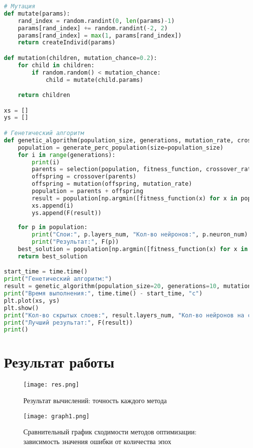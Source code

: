 \documentclass[a4paper, 14pt]{extarticle}
\begin{document}
\begin{lstlisting}[language=Python,caption={gen.py},label={lst:code3}]
# Мутация
def mutate(params):
    rand_index = random.randint(0, len(params)-1)
    params[rand_index] += random.randint(-2, 2)
    params[rand_index] = max(1, params[rand_index])
    return createIndivid(params)

def mutation(children, mutation_chance=0.2):
    for child in children:
        if random.random() < mutation_chance:
            child = mutate(child.params)

    return children

xs = []
ys = []

# Генетический алгоритм
def genetic_algorithm(population_size, generations, mutation_rate, crossover_rate):
    population = generate_perc_population(size=population_size)
    for i in range(generations):
        print(i)
        parents = selection(population, fitness_function, crossover_rate)
        offspring = crossover(parents)
        offspring = mutation(offspring, mutation_rate)
        population = parents + offspring
        result = population[np.argmin([fitness_function(x) for x in population])]
        xs.append(i)
        ys.append(F(result))
    
    for p in population:
        print("Слои:", p.layers_num, "Кол-во нейронов:", p.neuron_num)
        print("Результат:", F(p))
    best_solution = population[np.argmin([fitness_function(x) for x in population])]
    return best_solution

start_time = time.time()
print("Генетический алгоритм:")
result = genetic_algorithm(population_size=20, generations=10, mutation_rate=0.2, crossover_rate=0.5)
print("Время выполнения:", time.time() - start_time, "c")
plt.plot(xs, ys)
plt.show()
print("Кол-во скрытых слоев:", result.layers_num, "Кол-во нейронов на скрытых слоях:", result.neuron_num)
print("Лучший результат:", F(result))
print()
\end{lstlisting}

\section{Результат работы}\label{Sect::res}

\begin{figure}[!h]
    \centering
    \texttt{[image: res.png]}
    \caption{Результат вычислений: точность каждого метода}
    \label{fig:enter-label3}
\end{figure}

\begin{figure}[!h]
    \centering
    \texttt{[image: graph1.png]}
    \caption{Сравнительный график сходимости методов оптимизации:\\ зависимость значения ошибки от количества эпох}
    \label{fig:enter-label5}
\end{figure}
\end{document}
